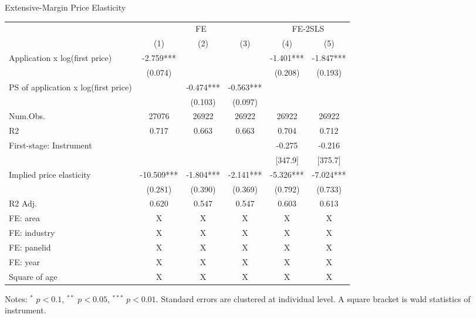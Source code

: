 \documentclass[
  ignorenonframetext,
  aspectratio=169,
]{beamer}
\begin{document}
\begin{frame}{Extensive-Margin Price Elasticity}
\protect\hypertarget{extensive-margin-price-elasticity}{}
\begin{table}
\centering
\fontsize{7}{9}\selectfont
\begin{threeparttable}
\begin{tabular}[t]{lccccc}
\toprule
\multicolumn{1}{c}{ } & \multicolumn{3}{c}{FE} & \multicolumn{2}{c}{FE-2SLS} \\
\cmidrule(l{3pt}r{3pt}){2-4} \cmidrule(l{3pt}r{3pt}){5-6}
  & (1) & (2) & (3) & (4) & (5)\\
\midrule
Application x log(first price) & -2.759*** &  &  & -1.401*** & -1.847***\\
 & (0.074) &  &  & (0.208) & (0.193)\\
PS of application x log(first price) &  & -0.474*** & -0.563*** &  & \\
 &  & (0.103) & (0.097) &  & \\
\midrule
Num.Obs. & 27076 & 26922 & 26922 & 26922 & 26922\\
R2 & 0.717 & 0.663 & 0.663 & 0.704 & 0.712\\
First-stage: Instrument &  &  &  & -0.275 & -0.216\\
 &  &  &  & [347.9] & [375.7]\\
Implied price elasticity & -10.509*** & -1.804*** & -2.141*** & -5.326*** & -7.024***\\
 & (0.281) & (0.390) & (0.369) & (0.792) & (0.733)\\
R2 Adj. & 0.620 & 0.547 & 0.547 & 0.603 & 0.613\\
FE: area & X & X & X & X & X\\
FE: industry & X & X & X & X & X\\
FE: panelid & X & X & X & X & X\\
FE: year & X & X & X & X & X\\
Square of age & X & X & X & X & X\\
\bottomrule
\end{tabular}
\begin{tablenotes}
\item Notes: $^{*}$ $p < 0.1$, $^{**}$ $p < 0.05$, $^{***}$ $p < 0.01$. Standard errors are clustered at individual level. A square bracket is wald statistics of instrument.
\end{tablenotes}
\end{threeparttable}
\end{table}
\end{frame}
\end{document}
